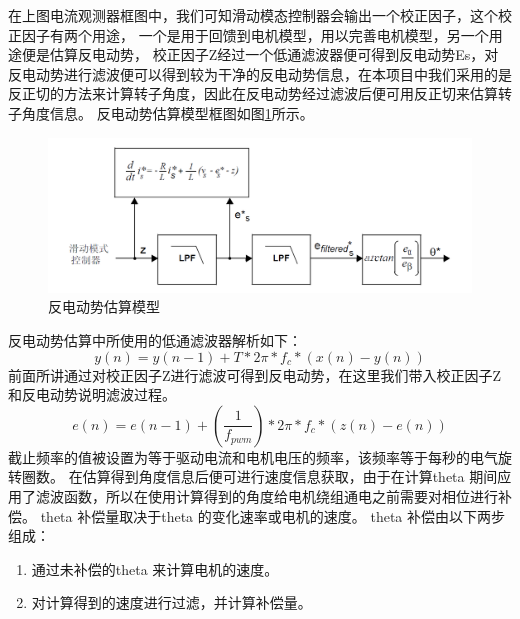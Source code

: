 ﻿\documentclass[12pt,a4paper]{article}
\begin{document}
在上图电流观测器框图中，我们可知滑动模态控制器会输出一个校正因子，这个校正因子有两个用途，
一个是用于回馈到电机模型，用以完善电机模型，另一个用途便是估算反电动势\cite{Zhang2022a}，
校正因子Z经过一个低通滤波器便可得到反电动势Es，对反电动势进行滤波便可以得到较为干净的反电动势信息，在本项目中我们采用的是反正切的方法来计算转子角度，因此在反电动势经过滤波后便可用反正切来估算转子角度信息。
反电动势估算模型框图如图\ref{Con_2}所示。
\begin{figure}
  \centering
  \includegraphics[width=\textwidth]{./picture/反电动势估算模型.png}
  \caption{反电动势估算模型}
  \label{Con_2}
\end{figure}

反电动势估算中所使用的低通滤波器解析如下：
\begin{equation}
  y(n)=y(n-1)+T*2\pi*f_c*(x(n)-y(n))
\end{equation}
前面所讲通过对校正因子Z进行滤波可得到反电动势，在这里我们带入校正因子Z和反电动势说明滤波过程。
\begin{equation}
  e(n)=e(n-1)+(\frac{1}{f_{pwm}})*2\pi*f_c*(z(n)-e(n))
\end{equation}
截止频率的值被设置为等于驱动电流和电机电压的频率，该频率等于每秒的电气旋转圈数。
在估算得到角度信息后便可进行速度信息获取，由于在计算theta 期间应用了滤波函数，所以在使用计算得到的角度给电机绕组通电之前需要对相位进行补偿。
theta 补偿量取决于theta 的变化速率或电机的速度。
theta 补偿由以下两步组成：
\begin{enumerate}
  \item 通过未补偿的theta 来计算电机的速度。
  \item 对计算得到的速度进行过滤，并计算补偿量。
\end{enumerate}
\end{document}
